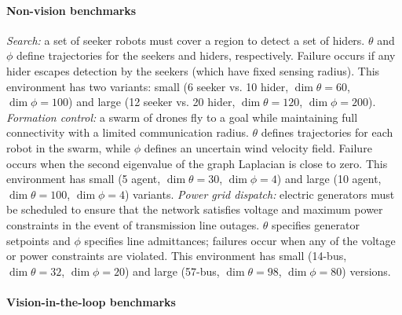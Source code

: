 \paragraph{Non-vision benchmarks}
%
\textit{Search:} a set of seeker robots must cover a region to detect a set of hiders. $\theta$ and $\phi$ define trajectories for the seekers and hiders, respectively. Failure occurs if any hider escapes detection by the seekers (which have fixed sensing radius). This environment has two variants: small (6 seeker vs. 10 hider, $\dim{\theta} = 60$, $\dim{\phi} = 100$) and large (12 seeker vs. 20 hider, $\dim{\theta} = 120$, $\dim{\phi} = 200$).
%
\textit{Formation control:} a swarm of drones fly to a goal while maintaining full connectivity with a limited communication radius. $\theta$ defines trajectories for each robot in the swarm, while $\phi$ defines an uncertain wind velocity field. Failure occurs when the second eigenvalue of the graph Laplacian is close to zero. This environment has small (5 agent, $\dim{\theta} = 30$, $\dim{\phi} = 4$) and large (10 agent, $\dim{\theta} = 100$, $\dim{\phi} = 4$) variants.
%
\textit{Power grid dispatch:} electric generators must be scheduled to ensure that the network satisfies voltage and maximum power constraints in the event of transmission line outages. $\theta$ specifies generator setpoints and $\phi$ specifies line admittances; failures occur when any of the voltage or power constraints are violated. This environment has small (14-bus, $\dim{\theta} = 32$, $\dim{\phi} = 20$) and large (57-bus, $\dim{\theta} = 98$, $\dim{\phi} = 80$) versions.

\paragraph{Vision-in-the-loop benchmarks}

